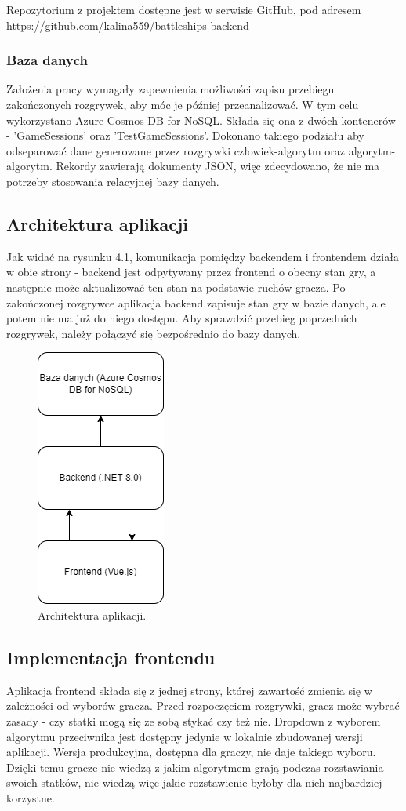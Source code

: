 Repozytorium z projektem dostępne jest w serwisie GitHub, pod adresem \url{https://github.com/kalina559/battleships-backend}
\subsubsection{Baza danych}

Założenia pracy wymagały zapewnienia możliwości zapisu przebiegu zakończonych rozgrywek, aby móc je później przeanalizować. W tym celu wykorzystano Azure Cosmos DB for NoSQL. Składa się ona z dwóch kontenerów - 'GameSessions' oraz 'TestGameSessions'. Dokonano takiego podziału aby odseparować dane generowane przez rozgrywki człowiek-algorytm oraz algorytm-algorytm. Rekordy zawierają dokumenty JSON, więc zdecydowano, że nie ma potrzeby stosowania relacyjnej bazy danych.

\subsection{Architektura aplikacji}

Jak widać na rysunku 4.1, komunikacja pomiędzy backendem i frontendem działa w obie strony - backend jest odpytywany przez frontend o obecny stan gry, a następnie może aktualizować ten stan na podstawie ruchów gracza. Po zakończonej rozgrywce aplikacja backend zapisuje stan gry w bazie danych, ale potem nie ma już do niego dostępu. Aby sprawdzić przebieg poprzednich rozgrywek, należy połączyć się bezpośrednio do bazy danych.

\begin{figure}[!h]
    \label{fig:architektura}
    \centering \includegraphics[width=0.2\linewidth]{img/architecture.drawio.png}
    \caption{Architektura aplikacji.}
\end{figure}

\subsection{Implementacja frontendu}
\indent Aplikacja frontend składa się z jednej strony, której zawartość zmienia się w zależności od wyborów gracza. Przed rozpoczęciem rozgrywki, gracz może wybrać zasady - czy statki mogą się ze sobą stykać czy też nie. Dropdown z wyborem algorytmu przeciwnika jest dostępny jedynie w lokalnie zbudowanej wersji aplikacji. Wersja produkcyjna, dostępna dla graczy, nie daje takiego wyboru. Dzięki temu gracze nie wiedzą z jakim algorytmem grają podczas rozstawiania swoich statków, nie wiedzą więc jakie rozstawienie byłoby dla nich najbardziej korzystne.

